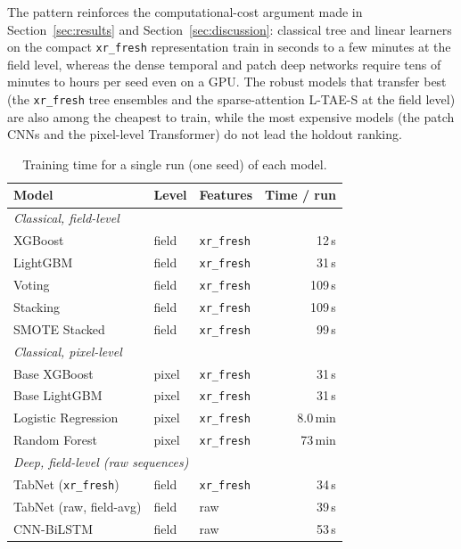 \documentclass[pdflatex,sn-mathphys]{sn-jnl} %
\begin{document}
The pattern reinforces the computational-cost argument made in
Section~\ref{sec:results} and Section~\ref{sec:discussion}: classical tree and linear
learners on the compact \texttt{xr\_fresh} representation train in seconds to a few
minutes at the field level, whereas the dense temporal and patch deep networks
require tens of minutes to hours per seed even on a GPU. The robust models that
transfer best (the \texttt{xr\_fresh} tree ensembles and the sparse-attention
L-TAE-S at the field level) are also among the cheapest to train, while the most
expensive models (the patch CNNs and the pixel-level Transformer) do
not lead the holdout ranking.

\begin{table}[htbp]
\centering
\scriptsize
\caption{Training time for a single run (one seed) of each model.}
\label{tab:training_times}
\renewcommand{\arraystretch}{1.12}
\setlength{\tabcolsep}{6pt}
\begin{tabular}{lllr}
\toprule
\textbf{Model} & \textbf{Level} & \textbf{Features} & \textbf{Time / run} \\
\midrule
\multicolumn{4}{l}{\emph{Classical, field-level}}\\
XGBoost                & field & \texttt{xr\_fresh} & 12\,s \\
LightGBM               & field & \texttt{xr\_fresh} & 31\,s \\
Voting                 & field & \texttt{xr\_fresh} & 109\,s \\
Stacking               & field & \texttt{xr\_fresh} & 109\,s \\
SMOTE Stacked          & field & \texttt{xr\_fresh} & 99\,s \\
\midrule
\multicolumn{4}{l}{\emph{Classical, pixel-level}}\\
Base XGBoost           & pixel & \texttt{xr\_fresh} & 31\,s \\
Base LightGBM          & pixel & \texttt{xr\_fresh} & 31\,s \\
Logistic Regression    & pixel & \texttt{xr\_fresh} & 8.0\,min \\
Random Forest          & pixel & \texttt{xr\_fresh} & 73\,min \\
\midrule
\multicolumn{4}{l}{\emph{Deep, field-level (raw sequences)}}\\
TabNet (\texttt{xr\_fresh}) & field & \texttt{xr\_fresh} & 34\,s \\
TabNet (raw, field-avg) & field & raw & 39\,s \\
CNN-BiLSTM             & field & raw & 53\,s \\

\end{tabular}
\end{table}
\end{document}
